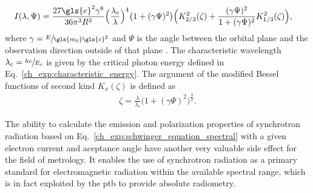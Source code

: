\begin{align}
  I(\lambda,\Psi) &= \frac{27 \gls{e}^2 \gamma^8 }{36 \pi^3 R^3} \Big(\frac{\lambda_c}{\lambda}\Big)^4 \big(1+ (\gamma \Psi)^2\big)\Big( K_{2/3}^2(\zeta) + \frac{(\gamma \Psi)^2}{1 + (\gamma \Psi)^2} K_{1/3}^2(\zeta)\Big) \text{,}
 \label{ch_exp:schwinger_equation_spectral}
\end{align}
where $\gamma = \sfrac{E}{\gls{m_0} \gls{c}^2}$ and $\Psi$ is the angle between the orbital plane and the observation direction outside of that plane \cite{schwinger_classical_1949}. The characteristic wavelength $\lambda_c = \sfrac{h c}{E_c}$ is given by the critical photon energy defined in Eq.~\eqref{ch_exp:characteristic_energy}. The argument of the modified Bessel functions of second kind $K_{x}(\zeta)$ is defined as
\begin{align}
 \zeta = \frac{\lambda}{\lambda_c} \big(1 + (\gamma \Psi)^2\big)^\frac{3}{2} \text{.}
\end{align}


The ability to calculate the emission and polarization properties of synchrotron radiation based on Eq.~\eqref{ch_exp:schwinger_equation_spectral} with a given electron current and aceptance angle have another very valuable side effect for the field of metrology. It enables the use of synchrotron radiation as a primary standard for electromagnetic radiation within the available spectral range, which is in fact exploited by the \gls{ptb} \cite{thornagel_electron_2001} to provide absolute radiometry.

